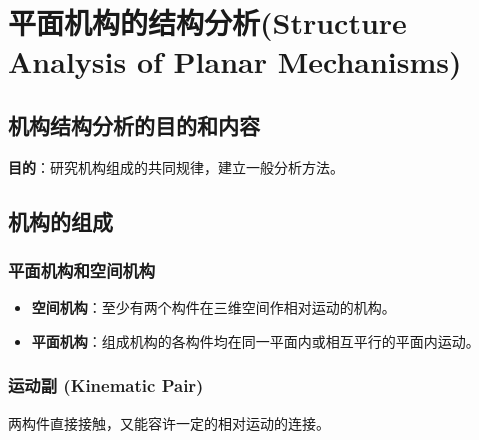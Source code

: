 \chapter{平面机构的结构分析(Structure Analysis of Planar Mechanisms)}


\section{机构结构分析的目的和内容}
\textbf{目的}：研究机构组成的共同规律，建立一般分析方法。

\section{机构的组成}
\subsection{平面机构和空间机构}
\begin{itemize}
    \item \textbf{空间机构}：至少有两个构件在三维空间作相对运动的机构。
    \item \textbf{平面机构}：组成机构的各构件均在同一平面内或相互平行的平面内运动。
\end{itemize}

\subsection{运动副 (Kinematic Pair)}
两构件直接接触，又能容许一定的相对运动的连接。

